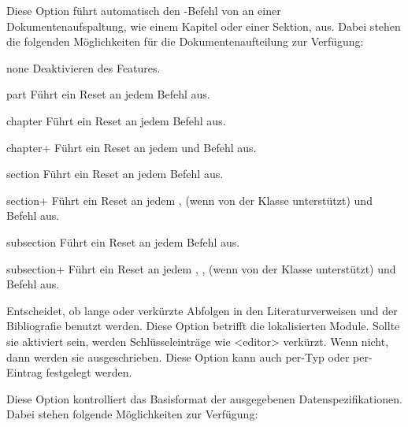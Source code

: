 \documentclass{ltxdockit}[2011/03/25]
\begin{document}
\begin{optionlist}

Diese Option führt automatisch den -Befehl von
 an einer Dokumentenaufspaltung, wie einem Kapitel oder
einer Sektion, aus. Dabei stehen die folgenden Möglichkeiten für die
Dokumentenaufteilung zur Verfügung:

\begin{valuelist} 
\item[none] Deaktivieren des Features.  
\item[part] Führt ein
Reset an jedem  Befehl aus.  
\item[chapter] Führt ein Reset an jedem
 Befehl aus.
\item[chapter+] Führt ein Reset an jedem  und  Befehl aus.
\item[section] Führt ein Reset an jedem 
Befehl aus. 
\item[section+] Führt ein Reset an jedem ,  (wenn
    von der Klasse unterstützt) und  Befehl aus.
\item[subsection] Führt ein Reset an jedem  Befehl
aus. 
\item[subsection+] Führt ein Reset an jedem , ,  (wenn von der Klasse unterstützt) und  Befehl aus.
\end{valuelist}
%


Entscheidet, ob lange oder verkürzte Abfolgen in den Literaturverweisen und der
Bibliografie benutzt werden. Diese Option betrifft die lokalisierten Module.
Sollte sie aktiviert sein, werden Schlüsseleinträge wie <editor> verkürzt. Wenn
nicht, dann werden sie ausgeschrieben. Diese Option kann auch per-Typ oder 
per-Eintrag festgelegt werden.


Diese Option kontrolliert das Basisformat der ausgegebenen Datenspezifikationen.
Dabei stehen folgende Möglichkeiten zur Verfügung:


\end{optionlist}
\end{document}

